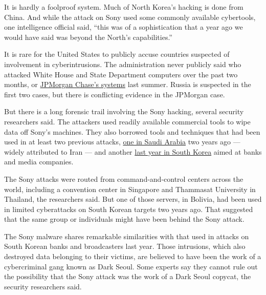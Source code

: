 It is hardly a foolproof system. Much of North Korea's hacking is done
from China. And while the attack on Sony used some commonly available
cybertools, one intelligence official said, ``this was of a
sophistication that a year ago we would have said was beyond the North's
capabilities.''

It is rare for the United States to publicly accuse countries suspected
of involvement in cyberintrusions. The administration never publicly
said who attacked White House and State Department computers over the
past two months, or
\href{http://dealbook.nytimes.com/2014/10/02/jpmorgan-discovers-further-cyber-security-issues/?module=Search\&mabReward=relbias\%3Ar\%2C\%7B\%221\%22\%3A\%22RI\%3A8\%22\%7D}{JPMorgan
Chase's systems} last summer. Russia is suspected in the first two
cases, but there is conflicting evidence in the JPMorgan case.

But there is a long forensic trail involving the Sony hacking, several
security researchers said. The attackers used readily available
commercial tools to wipe data off Sony's machines. They also borrowed
tools and techniques that had been used in at least two previous
attacks,
\href{http://www.nytimes.com/2012/10/14/world/middleeast/us-suspects-iranians-were-behind-a-wave-of-cyberattacks.html?pagewanted=all\&module=Search\&mabReward=relbias\%3Ar\%2C\%7B\%221\%22\%3A\%22RI\%3A8\%22\%7D}{one
in Saudi Arabia} two years ago --- widely attributed to Iran --- and
another
\href{http://www.nytimes.com/2013/03/21/world/asia/south-korea-computer-network-crashes.html?pagewanted=all\&module=Search\&mabReward=relbias\%3Ar\%2C\%7B\%221\%22\%3A\%22RI\%3A8\%22\%7D}{last
year in South Korea} aimed at banks and media companies.

The Sony attacks were routed from command-and-control centers across the
world, including a convention center in Singapore and Thammasat
University in Thailand, the researchers said. But one of those servers,
in Bolivia, had been used in limited cyberattacks on South Korean
targets two years ago. That suggested that the same group or individuals
might have been behind the Sony attack.

The Sony malware shares remarkable similarities with that used in
attacks on South Korean banks and broadcasters last year. Those
intrusions, which also destroyed data belonging to their victims, are
believed to have been the work of a cybercriminal gang known as Dark
Seoul. Some experts say they cannot rule out the possibility that the
Sony attack was the work of a Dark Seoul copycat, the security
researchers said.

